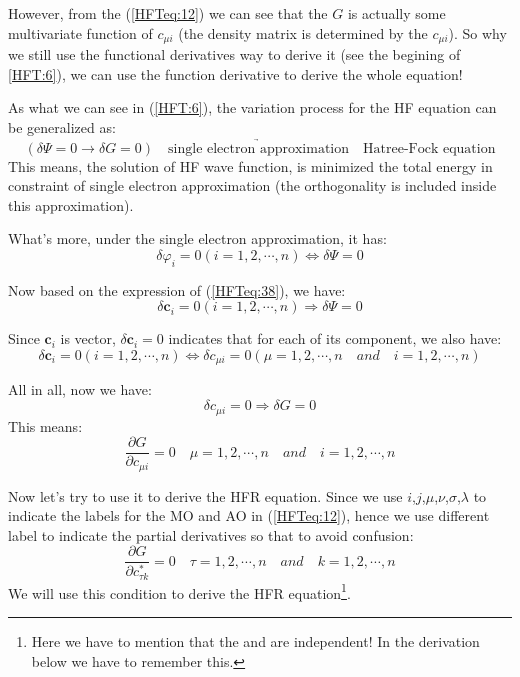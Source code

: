 However, from the (\ref{HFTeq:12}) we can see that the $G$ is actually some
multivariate function of $c_{\mu i}$ (the density matrix is determined by the
$c_{\mu i}$). So why we still use the functional derivatives way to derive it
(see the  begining of \ref{HFT:6}), we can use the function derivative to
derive the whole equation!

As what we can see in (\ref{HFT:6}), the variation process for the HF
equation can be generalized as:
\begin{equation}
 (\delta \Psi = 0 \rightarrow \delta G = 0)  \quad
\underrightarrow{\text{single electron approximation}} \quad 
\text{Hatree-Fock equation}
\end{equation}
This means, the solution of HF wave function, is minimized the total energy
in constraint of single electron approximation (the orthogonality is included
inside this approximation). 

What's more, under the single electron approximation, it has:
\begin{equation}
 \delta \varphi_{i} = 0 (i = 1,2, \cdots, n) \Leftrightarrow \delta \Psi = 0
\end{equation}

Now based on the expression of (\ref{HFTeq:38}), we have:
\begin{equation}
 \delta \bm{c}_{i} = 0 (i = 1,2, \cdots, n) \Longrightarrow \delta \Psi = 0
\end{equation}

Since $\bm{c}_{i}$ is vector, $\delta \bm{c}_{i} = 0$ indicates that for each
of its component, we also have:
\begin{equation}
 \delta \bm{c}_{i} = 0 (i = 1,2, \cdots, n) \Leftrightarrow
\delta c_{\mu i} = 0 (\mu = 1,2, \cdots, n \quad and \quad i = 1,2, \cdots, n )
\end{equation}

All in all, now we have:
\begin{equation}
\delta c_{\mu i} = 0 \Longrightarrow \delta G = 0
\end{equation}
This means:
\begin{equation}\label{HFReq:1_important}
 \frac{\partial G}{\partial c_{\mu i}} = 0 \quad \mu = 1,2, \cdots, n \quad and
\quad i = 1,2, \cdots, n
\end{equation}

Now let's try to use it to derive the HFR equation. Since we use
$i$,$j$,$\mu$,$\nu$,$\sigma$,$\lambda$ to indicate the labels for the MO and AO
in (\ref{HFTeq:12}), hence we use different label to indicate the partial
derivatives so that to avoid confusion:
\begin{equation}
 \frac{\partial G}{\partial c^{*}_{\tau k}} = 0 \quad \tau = 1,2, \cdots, n
\quad and
\quad k = 1,2, \cdots, n
\end{equation}
We will use this condition to derive the HFR equation\footnote{Here we have to
mention that the  and  are independent! In
the derivation below we have to remember this.}.

